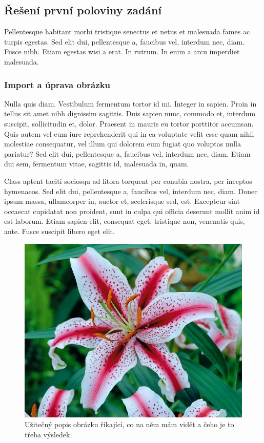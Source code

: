\documentclass{article}
\begin{document}
\subsection{Řešení první poloviny zadání}
\par Pellentesque habitant morbi tristique senectus et netus et malesuada fames ac turpis egestas. Sed elit dui, pellentesque a, faucibus vel, interdum nec, diam. Fusce nibh. Etiam egestas wisi a erat. In rutrum. In enim a arcu imperdiet malesuada.
\subsubsection{Import a úprava obrázku}
\par Nulla quis diam. Vestibulum fermentum tortor id mi. Integer in sapien. Proin in tellus sit amet nibh dignissim sagittis. Duis sapien nunc, commodo et, interdum suscipit, sollicitudin et, dolor. Praesent in mauris eu tortor porttitor accumsan. Quis autem vel eum iure reprehenderit qui in ea voluptate velit esse quam nihil molestiae consequatur, vel illum qui dolorem eum fugiat quo voluptas nulla pariatur? Sed elit dui, pellentesque a, faucibus vel, interdum nec, diam. Etiam dui sem, fermentum vitae, sagittis id, malesuada in, quam. 
\par Class aptent taciti sociosqu ad litora torquent per conubia nostra, per inceptos hymenaeos. Sed elit dui, pellentesque a, faucibus vel, interdum nec, diam. Donec ipsum massa, ullamcorper in, auctor et, scelerisque sed, est. Excepteur sint occaecat cupidatat non proident, sunt in culpa qui officia deserunt mollit anim id est laborum. Etiam sapien elit, consequat eget, tristique non, venenatis quis, ante. Fusce suscipit libero eget elit.
\begin{figure}[H]
	\centerline{\includegraphics[scale=0.3]{./pics/lilie.jpg}}
	\caption{Užitečný popis obrázku říkající, co na něm mám vidět a čeho je to třeba výsledek.}
\end{figure}
\end{document}
